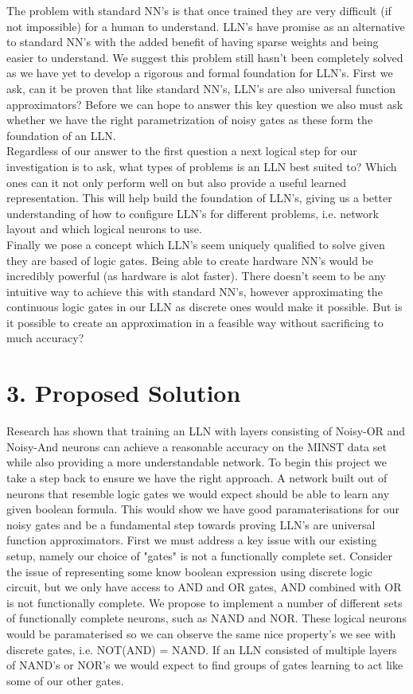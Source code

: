\documentclass[11pt, a4paper, twoside, openright]{report}
\begin{document}
The problem with standard NN's is that once trained they are very difficult (if not impossible) for a human to understand. LLN's have promise as an alternative to standard NN's with the added benefit of having sparse weights and being easier to understand. We suggest this problem still hasn't been completely solved as we have yet to develop a rigorous and formal foundation for LLN's. First we ask, can it be proven that like standard NN's, LLN's are also universal function approximators?  Before we can hope to answer this key question we also must ask whether we have the right parametrization of noisy gates as these form the foundation of an LLN. \\

Regardless of our answer to the first question a next logical step for our investigation is to ask, what types of problems is an LLN best suited to? Which ones can it not only perform well on but also provide a useful learned representation. This will help build the foundation of LLN's, giving us a better understanding of how to configure LLN's for different problems, i.e. network layout and which logical neurons to use.\\

Finally we pose a concept which LLN's seem uniquely qualified to solve given they are based of logic gates. Being able to create hardware NN's would be incredibly powerful (as hardware is alot faster). There doesn't seem to be any intuitive way to achieve this with standard NN's, however approximating the continuous logic gates in our LLN as discrete ones would make it possible. But is it possible to create an approximation in a feasible way without sacrificing to much accuracy?

\section*{3. Proposed Solution}

Research has shown that training an LLN with layers consisting of Noisy-OR and Noisy-And neurons can achieve a reasonable accuracy on the MINST data set while also providing a more understandable network. To begin this project we take a step back to ensure we have the right approach. A network built out of neurons that resemble logic gates we would expect should be able to learn any given boolean formula. This would show we have good paramaterisations for our noisy gates and be a fundamental step towards proving LLN's are universal function approximators. First we must address a key issue with our existing setup, namely our choice of "gates" is not a functionally complete set. Consider the issue of representing some know boolean expression using discrete logic circuit, but we only have access to AND and OR gates, AND combined with OR is not functionally complete. We propose to implement a number of different sets of functionally complete neurons, such as NAND and NOR. These logical neurons would be paramaterised so we can observe the same nice property's we see with discrete gates, i.e. NOT(AND) = NAND. If an LLN consisted of multiple layers of NAND's or NOR's we would expect to find groups of gates learning to act like some of our other gates. \\
\end{document}
